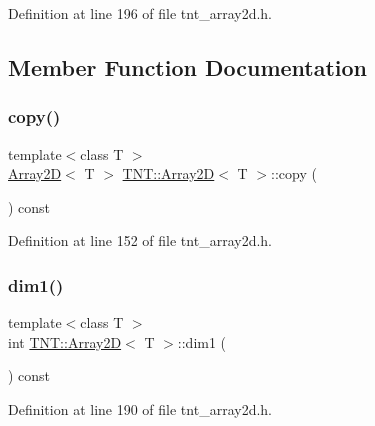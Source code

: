 Definition at line 196 of file tnt\+\_\+array2d.\+h.



\subsection{Member Function Documentation}
\mbox{\label{classTNT_1_1Array2D_a19bbe91d984c88b68ab5d7e53be9e177}} 
\subsubsection{\texorpdfstring{copy()}{copy()}}
{\footnotesize\ttfamily template$<$class T $>$ \\
\hyperlink{classTNT_1_1Array2D}{Array2D}$<$ T $>$ \hyperlink{classTNT_1_1Array2D}{T\+N\+T\+::\+Array2D}$<$ T $>$\+::copy (\begin{DoxyParamCaption}{ }\end{DoxyParamCaption}) const}



Definition at line 152 of file tnt\+\_\+array2d.\+h.

\mbox{\label{classTNT_1_1Array2D_a84da0cfbe21a838fc85e1bac304e57ba}} 
\subsubsection{\texorpdfstring{dim1()}{dim1()}}
{\footnotesize\ttfamily template$<$class T $>$ \\
int \hyperlink{classTNT_1_1Array2D}{T\+N\+T\+::\+Array2D}$<$ T $>$\+::dim1 (\begin{DoxyParamCaption}{ }\end{DoxyParamCaption}) const\hspace{0.3cm}{\ttfamily [inline]}}



Definition at line 190 of file tnt\+\_\+array2d.\+h.

\mbox{\label{classTNT_1_1Array2D_adb4020fe0eb3cd695080a9c56a1d7c5c}} 
